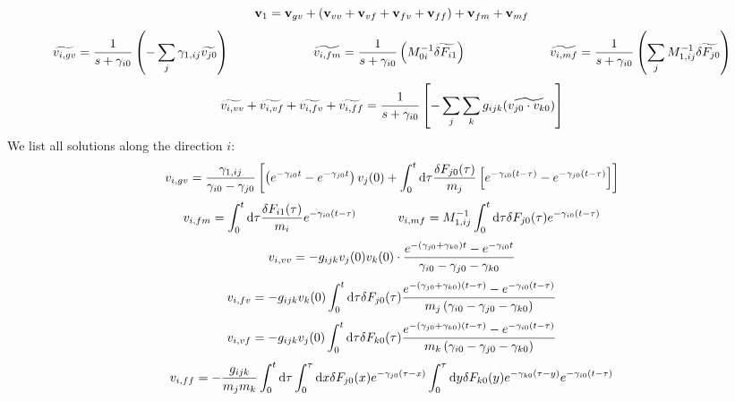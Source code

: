 \documentclass[fleqn,10pt]{InternshipReport_SI-ENS-PSL}
\begin{document}
$$ \mathbf{v}_{1} = \mathbf{v}_{gv} + \left( \mathbf{v}_{vv} + \mathbf{v}_{vf} + \mathbf{v}_{fv} + \mathbf{v}_{ff} \right) + \mathbf{v}_{fm} + \mathbf{v}_{mf} $$
$$ \widetilde{v_{i,gv}} = \frac{1}{s + \gamma_{i0}} \left( - \sum_j \gamma_{1,ij} \widetilde{v_{j0}} \right) \ \ \ \ \ \ \ \ \ \  \ \ \ \ \ \ \ \ \ \  
\widetilde{v_{i,fm}} = \frac{1}{s + \gamma_{i0}} \left( M^{-1}_{0i} \widetilde{\delta F_{i1}} \right) \ \ \ \ \ \ \ \ \ \  \ \ \ \ \ \ \ \ \ \  
\widetilde{v_{i,mf}} = \frac{1}{s + \gamma_{i0}} \left( \sum_j M^{-1}_{1,ij} \widetilde{\delta F_{j0}} \right) $$
$$ \widetilde{v_{i,vv}} + \widetilde{v_{i,vf}} + \widetilde{v_{i,fv}} + \widetilde{v_{i,ff}} = \frac{1}{s + \gamma_{i0}} \left[ - \sum_j \sum_k g_{ijk} (\widetilde{v_{j0} \cdot v_{k0}}) \right] $$
We list all solutions along the direction $i$:
$$  v_{i,gv} = \frac{\gamma_{1,ij}}{\gamma_{i0} - \gamma_{j0}} \left[ \left( e^{- \gamma_{i0} t} - e^{-\gamma_{j0} t} \right) v_j (0) + \int_0^t \mathrm{d}\tau \frac{\delta F_{j0}(\tau)}{m_j} \left[ e^{- \gamma_{i0} (t-\tau)} - e^{-\gamma_{j0} (t-\tau)} \right] \right] $$
$$ v_{i,fm} = \int_0^t \mathrm{d}\tau \frac{\delta F_{i1} (\tau)}{m_i} e^{-\gamma_{i0} (t-\tau)} \ \ \ \ \ \ \ \ \ \ 
 v_{i,mf} = M^{-1}_{1,ij} \int_0^t \mathrm{d}\tau \delta F_{j0} (\tau) e^{-\gamma_{i0} (t-\tau)} $$
$$ v_{i,vv} = - g_{ijk} v_j (0) v_k (0) \cdot \frac{e^{-(\gamma_{j0} + \gamma_{k0}) t} - e^{-\gamma_{i0} t}}{\gamma_{i0} - \gamma_{j0} - \gamma_{k0}} $$
$$ v_{i,fv} = - g_{ijk} v_k (0) \int_0^t \mathrm{d}\tau \delta F_{j0} (\tau) \frac{e^{-(\gamma_{j0} + \gamma_{k0}) (t-\tau)} - e^{-\gamma_{i0} (t-\tau)}}{m_j \left( \gamma_{i0} - \gamma_{j0} - \gamma_{k0} \right)} $$
$$ v_{i,vf} = - g_{ijk} v_j (0) \int_0^t \mathrm{d}\tau \delta F_{k0} (\tau) \frac{e^{-(\gamma_{j0} + \gamma_{k0}) (t-\tau)} - e^{-\gamma_{i0} (t-\tau)}}{m_k \left( \gamma_{i0} - \gamma_{j0} - \gamma_{k0} \right)} $$
$$ v_{i,ff} = - \frac{g_{ijk}}{m_j m_k} \int_0^t \mathrm{d}\tau  \int_0^\tau \mathrm{d}x \delta F_{j0} (x) e^{-\gamma_{j0} (\tau - x)}  \int_0^\tau \mathrm{d}y \delta F_{k0} (y) e^{-\gamma_{k0} (\tau - y)} e^{- \gamma_{i0} (t-\tau)} $$ 


\end{document}
